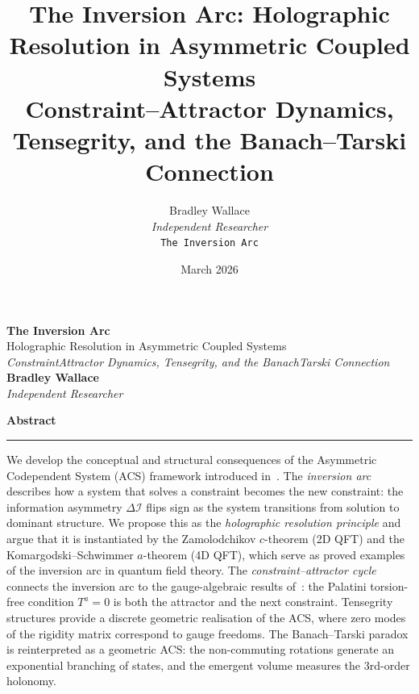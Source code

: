 \documentclass[11pt,a4paper]{article}
\title{\textbf{The Inversion Arc: Holographic Resolution in Asymmetric Coupled Systems}\\[0.4em]
       \large Constraint--Attractor Dynamics, Tensegrity, and the Banach--Tarski Connection}
\author{Bradley Wallace\\[0.3em]
        \small \textit{Independent Researcher}\\[0.2em]
        \small \texttt{The Inversion Arc}}
\date{March 2026}
\theoremstyle{plain}
\theoremstyle{definition}
\theoremstyle{remark}
\newcommand{\DI}{\Delta\mathcal{I}}
\begin{document}
\begin{titlepage}
\thispagestyle{empty}

\noindent{\color{acsrule}\rule{\textwidth}{0.4pt}}
\vspace{6pt}
\vspace{6pt}
\noindent{\color{acsrule}\rule{\textwidth}{0.4pt}}

\vspace{0.6in}

\begin{center}
  {\Huge\bfseries\color{acsprimary} The Inversion Arc}\\[0.4em]
  {\Large\color{acsslate} Holographic Resolution in Asymmetric Coupled Systems}\\[1.2em]
  {\normalsize\itshape\color{acsslate}
    Constraint\textendash Attractor Dynamics, Tensegrity, and the Banach\textendash Tarski Connection}\\[2.0em]
  {\large\bfseries Bradley Wallace}\\[0.25em]
  {\small\itshape\color{acsslate} Independent Researcher}
\end{center}

\vspace{0.5in}

\begin{center}
\begin{minipage}{0.88\textwidth}
\begin{center}
  {\bfseries\color{acsprimary}\large Abstract}\\[0.3em]
  {\color{acsrule}\rule{1.2in}{0.3pt}}
\end{center}
\vspace{0.5em}
\small\noindent
We develop the conceptual and structural consequences of the Asymmetric
Codependent System (ACS) framework introduced in~\cite{Wallace2026a}.
The \emph{inversion arc} describes how a system that solves a constraint
becomes the new constraint: the information asymmetry $\DI$ flips sign as
the system transitions from solution to dominant structure.  We propose
this as the \emph{holographic resolution principle} and argue that it is
instantiated by the Zamolodchikov $c$-theorem (2D QFT) and the
Komargodski--Schwimmer $a$-theorem (4D QFT), which serve as proved
examples of the inversion arc in quantum field theory.  The
\emph{constraint--attractor cycle} connects the inversion arc to the
gauge-algebraic results of~\cite{Wallace2026a}: the Palatini torsion-free
condition $T^a = 0$ is both the attractor and the next constraint.
Tensegrity structures provide a discrete geometric realisation of the
ACS, where zero modes of the rigidity matrix correspond to gauge freedoms.
The Banach--Tarski paradox is reinterpreted as a geometric ACS: the
non-commuting rotations generate an exponential branching of states, and
the emergent volume measures the 3rd-order holonomy.
\end{minipage}
\end{center}

\vfill

\noindent{\color{acsrule}\rule{\textwidth}{0.4pt}}
\end{titlepage}
\end{document}
